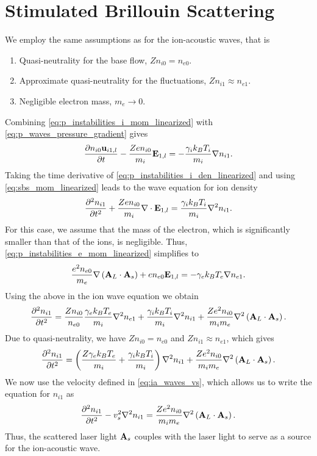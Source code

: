\documentclass[a4paper,11pt]{report}
\begin{document}
\section{Stimulated Brillouin Scattering}
We employ the same assumptions as for the ion-acoustic waves, that is
\begin{enumerate}
    \item Quasi-neutrality for the base flow, $Zn_{i0} = n_{e0}$.
    \item Approximate quasi-neutrality for the fluctuations, $Z n_{i1} \approx n_{e1}$.
    \item Negligible electron mass, $m_e \to 0$.
\end{enumerate}
Combining \cref{eq:p_instabilities_i_mom_linearized} with \cref{eq:p_waves_pressure_gradient} gives
\begin{equation}
    \label{eq:sbs_mom_linearized}
    \frac{\partial n_{i0} \mathbf{u}_{i1,l}}{\partial t} - \frac{Z e n_{i0}}{m_i} \mathbf{E}_{1,l} = - \frac{\gamma_i k_B T_i}{m_i} \nabla n_{i1}.
\end{equation}
Taking the time derivative of \cref{eq:p_instabilities_i_den_linearized} and using \cref{eq:sbs_mom_linearized} leads to the wave equation for ion density
\begin{equation}
    \frac{\partial^2 n_{i1}}{\partial t^2} + \frac{Z e n_{i0}}{m_i} \nabla \cdot \mathbf{E}_{1,l} = \frac{\gamma_i k_B T_i}{m_i} \nabla^2 n_{i1}.
\end{equation}
For this case, we assume that the mass of the electron, which is significantly smaller than that of the ions, is negligible. Thus, \cref{eq:p_instabilities_e_mom_linearized} simplifies to 
\begin{equation}
    \frac{e^2 n_{e0}}{m_e} \nabla \left (\mathbf{A}_L \cdot \mathbf{A}_s \right ) + e n_{e0} \mathbf{E}_{1,l} = -\gamma_e k_B T_e \nabla n_{e1}.
\end{equation}
Using the above in the ion wave equation we obtain
\begin{equation}
    \frac{\partial^2 n_{i1}}{\partial t^2} = \frac{Z n_{i0}}{n_{e0}} \frac{\gamma_e k_B T_e}{m_i} \nabla^2 n_{e1} + \frac{\gamma_i k_B T_i}{m_i} \nabla^2 n_{i1} + \frac{Z e^2 n_{i0}}{m_i m_e} \nabla^2 \left (\mathbf{A}_L \cdot \mathbf{A}_s \right ).
\end{equation}
Due to quasi-neutrality, we have $Zn_{i0} = n_{e0}$ and $Zn_{i1} \approx n_{e1}$, which gives
\begin{equation}
    \frac{\partial^2 n_{i1}}{\partial t^2} = \left ( \frac{Z \gamma_e k_B T_e}{m_i} + \frac{\gamma_i k_B T_i}{m_i} \right ) \nabla^2 n_{i1} + \frac{Z e^2 n_{i0}}{m_i m_e} \nabla^2 \left (\mathbf{A}_L \cdot \mathbf{A}_s \right ).
\end{equation}
We now use the velocity defined in \cref{eq:ia_waves_vs}, which allows us to write the equation for $n_{i1}$ as
\begin{equation}
    \frac{\partial^2 n_{i1}}{\partial t^2} - v_s^2 \nabla^2 n_{i1} = \frac{Z e^2 n_{i0}}{m_i m_e} \nabla^2 \left (\mathbf{A}_L \cdot \mathbf{A}_s \right ).
\end{equation}
Thus, the scattered laser light $\mathbf{A}_s$ couples with the laser light to serve as a source for the ion-acoustic wave.
\end{document}
